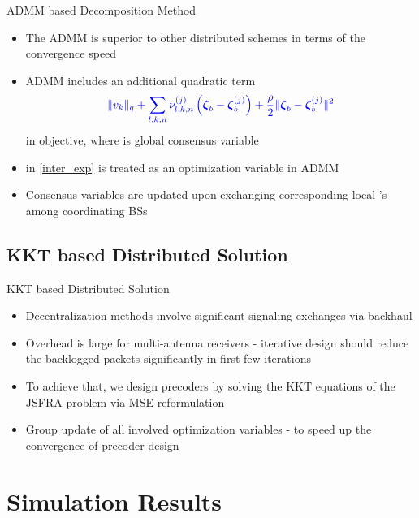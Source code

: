 \documentclass[9pt]{beamer}
\begin{document}
\begin{frame}{ADMM based Decomposition Method}
	\begin{itemize}
		\item The \ac{ADMM} is superior to other distributed schemes in terms of the convergence speed
		\item \ac{ADMM} includes an additional quadratic term 
		\begin{equation}
		\color{blue} \|v_k\|_q + \sum_{l,k,n} \nu_{l,k,n}^{(j)} \left ( {\boldsymbol{\zeta}}_b - {\boldsymbol{\zeta}}^{(j)}_b \right ) + \frac{\rho}{2}  \| {\boldsymbol{\zeta}}_b - {\boldsymbol{\zeta}}^{(j)}_b \|^2
		\end{equation}
		in objective, where  is global consensus variable
		\item {} in \eqref{inter_exp} is \alert{treated as an optimization variable in \ac{ADMM}}
		\item Consensus variables are updated upon exchanging corresponding local 's among coordinating \acp{BS}
	\end{itemize}
\end{frame}

\subsection{KKT based Distributed Solution}

\begin{frame}{KKT based Distributed Solution}
	\begin{itemize}
		\item Decentralization methods involve significant signaling exchanges via backhaul
		\item \alert{Overhead is large for multi-antenna receivers} - iterative design should reduce the backlogged packets significantly in first few iterations
		\item To achieve that, we design precoders by solving the \ac{KKT} equations of the \acs{JSFRA} problem via \acs{MSE} reformulation
		\item \alert{Group update of all involved optimization variables} - to speed up the convergence of precoder design
	\end{itemize}
\end{frame}

\section{Simulation Results}
\end{document}
